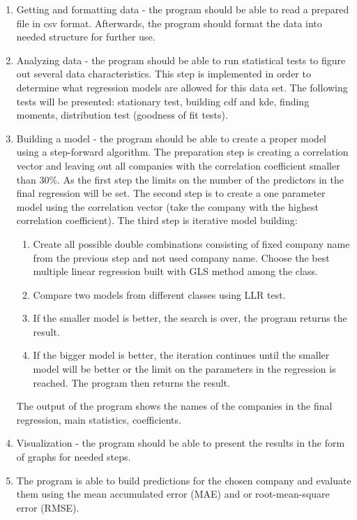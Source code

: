 \documentclass [twoside,
  11pt, a4paper,
  footinclude=true,
  headinclude=true,
  cleardoublepage=empty
]{article}
\begin{document}
\begin{enumerate}
    \item Getting and formatting data - the program should be able to read a prepared file in csv format. Afterwards, the program should format the data into needed structure for further use.
    \item Analyzing data - the program should be able to run statistical tests to figure out several data characteristics. This step is implemented in order to determine what regression models are allowed for this data set. The following tests will be presented: stationary test, building cdf and kde, finding moments, distribution test (goodness of fit tests).
    \item Building a model - the program should be able to create a proper model using a step-forward algorithm. The preparation step is creating a correlation vector and leaving out all companies with the correlation coefficient smaller than 30\%. As the first step the limits on the number of the predictors in the final regression will be set. The second step is to create a one parameter model using the correlation vector (take the company with the highest correlation coefficient). The third step is iterative model building: 
    \begin{enumerate}
        \item Create all possible double combinations consisting of fixed company name from the previous step and not used company name. Choose the best multiple linear regression built with GLS method among the class. 
        \item Compare two models from different classes using LLR test.
        \item If the smaller model is better, the search is over, the program returns the result.
        \item If the bigger model is better, the iteration continues until the smaller model will be better or the limit on the parameters in the regression is reached. The program then returns the result. 
    \end{enumerate}
The output of the program shows the names of the companies in the final regression, main statistics, coefficients.
    \item Visualization - the program should be able to present the results in the form of graphs for needed steps.
    \item The program is able to build predictions for the chosen company and evaluate them using the mean accumulated error (MAE) and or root-mean-square error (RMSE).
\end{enumerate}
\end{document}
